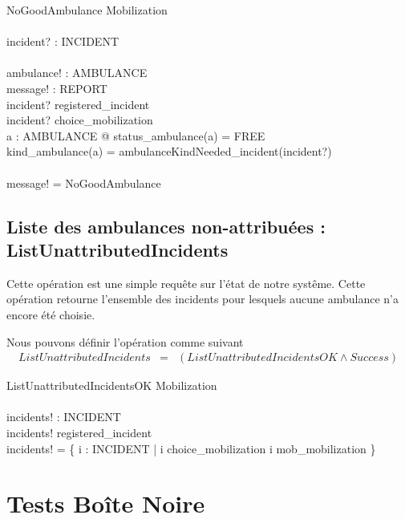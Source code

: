 \documentclass{report}
\begin{document}
\begin{schema}{NoGoodAmbulance}
	\Xi Mobilization		\\
	\newline				\\
	incident? : INCIDENT	\\
	\newline				\\
	ambulance! : AMBULANCE	\\
	message! : REPORT		\\
  \where
	incident? \in registered\_incident \\
	incident? \notin \ran choice\_mobilization \\
	\not \exists a : AMBULANCE @ status\_ambulance(a) = FREE \land \\
	 kind\_ambulance(a) = ambulanceKindNeeded\_incident(incident?) \\
	\newline \\
	message! = NoGoodAmbulance
\end{schema}

\section{Liste des ambulances non-attribuées : ListUnattributedIncidents}
Cette opération est une simple requête sur l'état de notre systême. Cette
opération retourne l'ensemble des incidents pour lesquels aucune ambulance
n'a encore été choisie.

Nous pouvons définir l'opération comme suivant
\begin{eqnarray*}
ListUnattributedIncidents & = & (ListUnattributedIncidentsOK \land Success)
\end{eqnarray*}

\begin{schema}{ListUnattributedIncidentsOK}
	\Xi Mobilization		\\
	\newline				\\
	incidents! : \power INCIDENT \\
  \where
	incidents! \subseteq registered\_incident \\
	incidents! = \{ i : INCIDENT | i \notin \ran choice\_mobilization \land i \notin \ran mob\_mobilization \}
\end{schema}

\chapter{Tests Boîte Noire}
\end{document}
